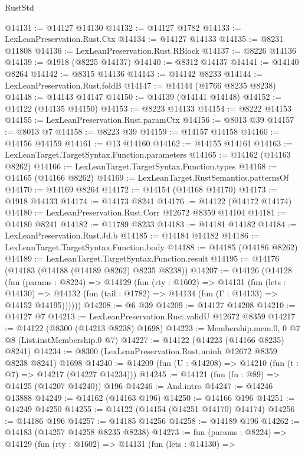\begin{lexlean}{RustStd}
\begin{coremodule}
@14131 := @14127 @14130
@14132 := @14127 @1782
@14133 := LexLeanPreservation.Rust.Ctx
@14134 := @14127 @14133
@14135 := @8231 @11808
@14136 := LexLeanPreservation.Rust.RBlock
@14137 := @8226 @14136
@14139 := @1918 (@8225 @14137)
@14140 := @8312 @14137
@14141 := @14140 @8264
@14142 := @8315 @14136
@14143 := @14142 @8233
@14144 := LexLeanPreservation.Rust.foldB
@14147 := @14144 (@1766 @8235 @8238)
@14148 := @14143 @14147
@14150 := @14139 (@14141 @14148)
@14152 := @14122 (@14135 @14150)
@14153 := @8223 @14133
@14154 := @8222 @14153
@14155 := LexLeanPreservation.Rust.paramCtx
@14156 := @8013 @39
@14157 := @8013 @7
@14158 := @8223 @39
@14159 := @14157 @14158
@14160 := @14156 @14159
@14161 := @13 @14160
@14162 := @14155 @14161
@14163 := LexLeanTarget.TargetSyntax.Function.parameters
@14165 := @14162 (@14163 @8262)
@14166 := LexLeanTarget.TargetSyntax.Function.types
@14168 := @14165 (@14166 @8262)
@14169 := LexLeanTarget.RustSemantics.patternsOf
@14170 := @14169 @8264
@14172 := @14154 (@14168 @14170)
@14173 := @1918 @14133
@14174 := @14173 @8241
@14176 := @14122 (@14172 @14174)
@14180 := LexLeanPreservation.Rust.Corr @12672 @8359 @14104
@14181 := @14180 @8241
@14182 := @11789 @8233
@14183 := @14181 @14182
@14184 := LexLeanPreservation.Rust.Jd.b
@14185 := @14184 @14182
@14186 := LexLeanTarget.TargetSyntax.Function.body
@14188 := @14185 (@14186 @8262)
@14189 := LexLeanTarget.TargetSyntax.Function.result
@14195 := @14176 (@14183 (@14188 (@14189 @8262) @8235 @8238))
@14207 := @14126
    (@14128
      (fun (params : @8224) =>
      @14129
        (fun (rty : @1602) =>
        @14131
          (fun (lets : @14130) =>
          @14132 (fun (tail : @1782) => @14134 (fun (Γ : @14133) => @14152 @14195))))))
@14208 := @6 @39
@14209 := @14127 @14208
@14210 := @14127 @7
@14213 := LexLeanPreservation.Rust.validU @12672 @8359
@14217 := @14122 (@8300 (@14213 @8238) @1698)
@14223 := Membership.mem.{0, 0} @7 @8 (List.instMembership.{0} @7)
@14227 := @14122 (@14223 (@14166 @8235) @8241)
@14234 := @8300 (LexLeanPreservation.Rust.uninh @12672 @8359 @8238 @8241) @1698
@14240 := @14209 (fun (U : @14208) => @14210 (fun (t : @7) => @14217 (@14227 @14234)))
@14245 := @14121 (fun (fn : @89) => @14125 (@14207 @14240)) @196
@14246 := And.intro
@14247 := @14246 @13888
@14249 := @14162 (@14163 @196)
@14250 := @14166 @196
@14251 := @14249 @14250
@14255 := @14122 (@14154 (@14251 @14170) @14174)
@14256 := @14186 @196
@14257 := @14185 @14256
@14258 := @14189 @196
@14262 := @14183 (@14257 @14258 @8235 @8238)
@14273 := fun (params : @8224) =>
  @14129
    (fun (rty : @1602) =>
    @14131
      (fun (lets : @14130) =>

\end{coremodule}
\end{lexlean}
